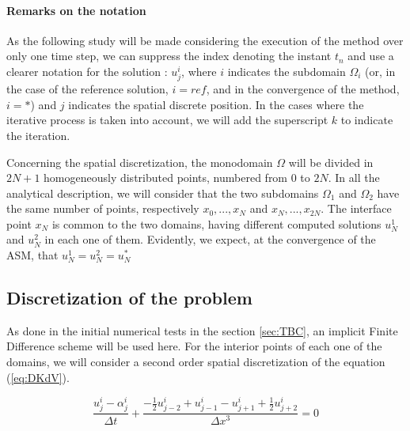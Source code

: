 \paragraph{Remarks on the notation}


\indent As the following study will be made considering the execution of the method over only one time step, we can suppress the index denoting the instant $t_n$ and use a clearer notation for the solution : $u_j^i$, where $i$ indicates the subdomain $\Omega_i$ (or, in the case of the reference solution, $i = ref$, and in the convergence of the method, $i = *$) and $j$ indicates the spatial discrete position. In the cases where the iterative process is taken into account, we will add the superscript $k$ to indicate the iteration.

\indent Concerning the spatial discretization, the monodomain $\Omega$ will be divided in $2N + 1$ homogeneously distributed points, numbered from $0$ to $2N$. In all the analytical description, we will consider that the two subdomains $\Omega_1$ and $\Omega_2$ have the same number of points, respectively $x_0,...,x_N$ and $x_N,...,x_{2N}$. The interface point $x_N$ is common to the two domains, having different computed solutions $u_N^1$ and $u_N^2$ in each one of them. Evidently, we expect, at the convergence of the ASM, that $u_N^1 = u_N^2 = u_N^*$

\subsection{Discretization of the problem}

\indent As done in the initial numerical tests in the section \ref{sec:TBC}, an implicit Finite Difference scheme will be used here. For the interior points of each one of the domains, we will consider a second order spatial discretization of the equation (\ref{eq:DKdV}).

\begin{equation}
    \label{eq:FDdiscretization}
    \frac{u_j^i - \alpha_j^i}{\Delta t} + \frac{-\frac{1}{2}u_{j-2}^i + u_{j-1}^i - u_{j+1}^i + \frac{1}{2}u_{j+2}^i }{\Delta x ^3} = 0
\end{equation}

